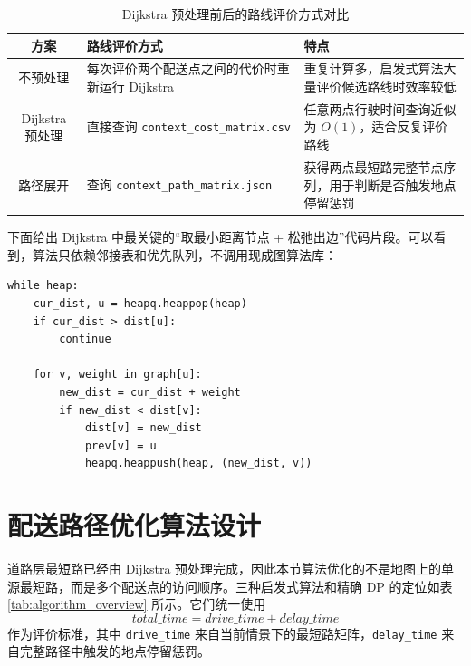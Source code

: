 \documentclass[12pt,a4paper,UTF8]{article}
\begin{document}
\begin{table}[H]
\centering
\caption{Dijkstra 预处理前后的路线评价方式对比}
\label{tab:dijkstra_preprocess_compare}
\small
\renewcommand{\arraystretch}{1.2}
\begin{tabularx}{\textwidth}{c|X|X}
\hline
方案 & 路线评价方式 & 特点 \\
\hline
不预处理 & 每次评价两个配送点之间的代价时重新运行 Dijkstra & 重复计算多，启发式算法大量评价候选路线时效率较低 \\
\hline
Dijkstra 预处理 & 直接查询 \texttt{context\_cost\_matrix.csv} & 任意两点行驶时间查询近似为 $O(1)$，适合反复评价路线 \\
\hline
路径展开 & 查询 \texttt{context\_path\_matrix.json} & 获得两点最短路完整节点序列，用于判断是否触发地点停留惩罚 \\
\hline
\end{tabularx}
\end{table}

下面给出 Dijkstra 中最关键的“取最小距离节点 + 松弛出边”代码片段。可以看到，算法只依赖邻接表和优先队列，不调用现成图算法库：

\begin{lstlisting}[caption={Dijkstra 核心松弛过程}]
while heap:
    cur_dist, u = heapq.heappop(heap)
    if cur_dist > dist[u]:
        continue

    for v, weight in graph[u]:
        new_dist = cur_dist + weight
        if new_dist < dist[v]:
            dist[v] = new_dist
            prev[v] = u
            heapq.heappush(heap, (new_dist, v))
\end{lstlisting}

\section{配送路径优化算法设计}

道路层最短路已经由 Dijkstra 预处理完成，因此本节算法优化的不是地图上的单源最短路，而是多个配送点的访问顺序。三种启发式算法和精确 DP 的定位如表 \ref{tab:algorithm_overview} 所示。它们统一使用
\[
    total\_time = drive\_time + delay\_time
\]
作为评价标准，其中 \texttt{drive\_time} 来自当前情景下的最短路矩阵，\texttt{delay\_time} 来自完整路径中触发的地点停留惩罚。
\end{document}
